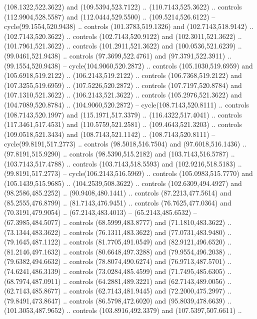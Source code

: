 \begin{scope}[shift={(58.28571,-442.36218)}]
    (108.1322,522.3622) and (109.5394,523.7122) .. (110.7143,525.3622) .. controls
    (112.9904,528.5587) and (112.0444,529.5500) .. (109.5214,526.6122) --
    cycle(99.1554,520.9438) .. controls (101.3783,519.1326) and
    (102.7143,518.9142) .. (102.7143,520.3622) .. controls (102.7143,520.9122) and
    (102.3011,521.3622) .. (101.7961,521.3622) .. controls (101.2911,521.3622) and
    (100.0536,521.6239) .. (99.0461,521.9438) .. controls (97.3699,522.4761) and
    (97.3791,522.3911) .. (99.1554,520.9438) -- cycle(104.9060,520.2872) ..
    controls (105.1030,519.6959) and (105.6918,519.2122) .. (106.2143,519.2122) ..
    controls (106.7368,519.2122) and (107.3255,519.6959) .. (107.5226,520.2872) ..
    controls (107.7197,520.8784) and (107.1310,521.3622) .. (106.2143,521.3622) ..
    controls (105.2976,521.3622) and (104.7089,520.8784) .. (104.9060,520.2872) --
    cycle(108.7143,520.8111) .. controls (108.7143,520.1997) and
    (115.1971,517.3379) .. (116.4322,517.4041) .. controls (117.3461,517.4531) and
    (110.5759,521.2581) .. (109.4643,521.3203) .. controls (109.0518,521.3434) and
    (108.7143,521.1142) .. (108.7143,520.8111) -- cycle(99.8191,517.2773) ..
    controls (98.5018,516.7504) and (97.6018,516.1436) .. (97.8191,515.9290) ..
    controls (98.5390,515.2182) and (103.7143,516.5787) .. (103.7143,517.4788) ..
    controls (103.7143,518.5593) and (102.9216,518.5183) .. (99.8191,517.2773) --
    cycle(106.2143,516.5969) .. controls (105.0983,515.7770) and
    (105.1439,515.9685) .. (104.2539,508.3622) .. controls (102.6309,494.4927) and
    (98.2586,485.2252) .. (90.9408,480.1441) .. controls (87.2213,477.5614) and
    (85.2555,476.8799) .. (81.7143,476.9451) .. controls (76.7625,477.0364) and
    (70.3191,479.9054) .. (67.2143,483.4013) -- (65.2143,485.6532) --
    (67.3985,484.5077) .. controls (68.5999,483.8777) and (71.1810,483.3622) ..
    (73.1344,483.3622) .. controls (76.1311,483.3622) and (77.0731,483.9480) ..
    (79.1645,487.1122) .. controls (81.7705,491.0549) and (82.9121,496.6520) ..
    (81.2146,497.1632) .. controls (80.6648,497.3288) and (79.9554,496.2038) ..
    (79.6382,494.6632) .. controls (78.8074,490.6274) and (76.9713,487.5701) ..
    (74.6241,486.3139) .. controls (73.0284,485.4599) and (71.7495,485.6305) ..
    (68.7974,487.0911) .. controls (64.2881,489.3221) and (62.7143,489.0056) ..
    (62.7143,485.8677) .. controls (62.7143,481.9445) and (72.2000,475.2997) ..
    (79.8491,473.8647) .. controls (86.5798,472.6020) and (95.8039,478.6639) ..
    (101.3053,487.9652) .. controls (103.8916,492.3379) and (107.5397,507.6611) ..

\end{scope}
